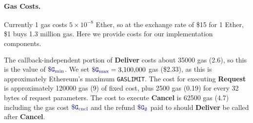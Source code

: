 
\paragraph{Gas Costs.}
Currently 1 gas costs $5 \times10^{-8}$ Ether, so at the exchange rate of \$15 for 1 Ether, \$1 buys 1.3 million gas.
Here we provide costs for our implementation components.


The callback-independent portion of {\bf Deliver} costs about \num[group-separator={,}]{35000} gas (2.6\textcent), so this is the value of $\constgasmin$.
We set $\constgasmax = \num[group-separator={,}]{3100000}$ gas (\$2.33), as this is approximately Ethereum's maximum {\tt GASLIMIT}.
The cost for executing {\bf Request} is approximately \num[group-separator={,}]{120000} gas (9\textcent) of fixed cost, 
plus \num[group-separator={,}]{2500} gas (0.19\textcent) for every 32 bytes of request parameters.
The cost to execute {\bf Cancel} is 62500 gas (4.7\textcent)
including the gas cost $\constgasinvokecancel$ and the refund $\constgascancel$ paid to \tc should {\bf Deliver} be called after {\bf Cancel}.

